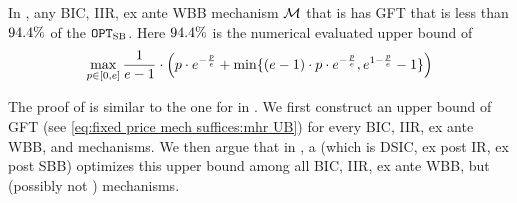 \begin{lemma}
    \label{lem:GFT UB:mhr buyer}
    In , any BIC, IIR, ex ante WBB mechanism $\mathcal{M}$ that is {\ksfair} has GFT that is less than ${94.4\%}$ of the {\SecondBest} $\texttt{OPT}_{\textsc{SB}}$. Here ${94.4\%}$ is the numerical evaluated upper bound of 
    \begin{align*}
        \max_{p\in[0, e]}\frac{1}{e - 1}\cdot \left(p\cdot e^{-\frac{p}{e}} + \min\{(e-1)\cdot p\cdot e^{-\frac{p}{e}},e^{1 - \frac{p}{e}} - 1\}\right)
    \end{align*}
\end{lemma}
The proof of  is similar to the one for  in . We first construct an upper bound of GFT (see \eqref{eq:fixed price mech suffices:mhr UB}) for every BIC, IIR, ex ante WBB, and {\ksfair} mechanisms. We then argue that in , a \emph{\ksfair} {\FixPrice} (which is DSIC, ex post IR, ex post SBB) optimizes this upper bound among all BIC, IIR, ex ante WBB, but (possibly not {\ksfair}) mechanisms.
